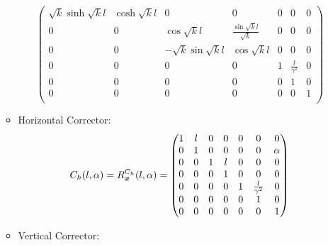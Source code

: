 \begin{itemize}
\begin{itemize}
\begin{equation*}
\begin{pmatrix}
                                                  \sqrt{k}\sinh{\sqrt{k} l} & \cosh{\sqrt{k} l} & 0 & 0 & 0 & 0 & 0 \\ %
                                                  0 & 0 & \cos{\sqrt{k} l} & \frac{\sin{\sqrt{k} l}}{\sqrt{k}} & 0 & 0 & 0 \\ %
                                                  0 & 0 & -\sqrt{k}\sin{\sqrt{k} l} & \cos{\sqrt{k} l} & 0 & 0 & 0  \\ %
                                                  0 & 0 & 0 & 0 & 1 & \frac{l}{\gamma^2} & 0 \\ %
                                                  0 & 0 & 0 & 0 & 0 & 1 & 0 \\ %
                                                  0 & 0 & 0 & 0 & 0 & 0 & 1 \\
                                              \end{pmatrix}
            \end{equation*}
        \item Horizontal Corrector: 
            \begin{equation*}
                C_h(l,\alpha) = R_{\actuators}^{C_h}(l,\alpha) = \begin{pmatrix}
                                                                 1 & l & 0 & 0 & 0 & 0 & 0 \\ %
                                                                 0 & 1 & 0 & 0 & 0 & 0 & \alpha \\ %
                                                                 0 & 0 & 1 & l & 0 & 0 & 0 \\ %
                                                                 0 & 0 & 0 & 1 & 0 & 0 & 0 \\ %
                                                                 0 & 0 & 0 & 0 & 1 & \frac{l}{\gamma^2} & 0 \\ %
                                                                 0 & 0 & 0 & 0 & 0 & 1 & 0 \\ %
                                                                 0 & 0 & 0 & 0 & 0 & 0 & 1 \\
                                                             \end{pmatrix}
            \end{equation*}
        \item Vertical Corrector:
            \begin{equation*}

\end{equation*}
\end{itemize}
\end{itemize}
